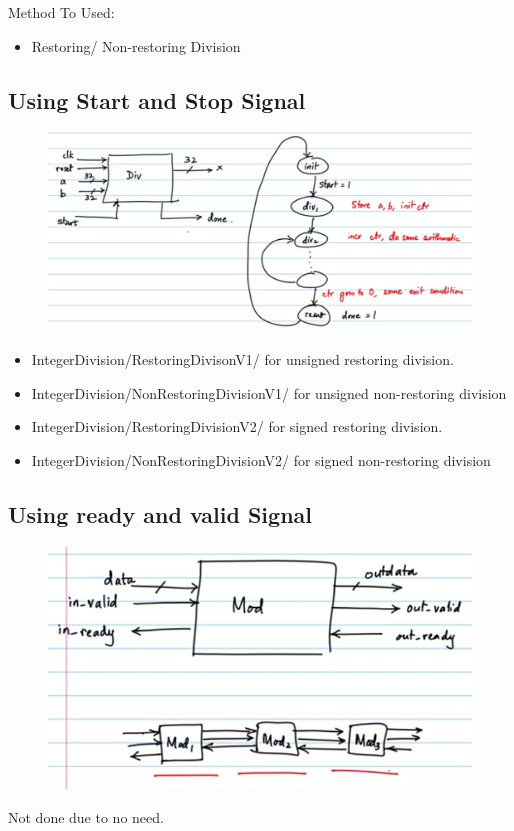 \documentclass{article}
\begin{document}
Method To Used:
\begin{itemize}
    \item Restoring/ Non-restoring Division
\end{itemize}


\subsection{Using Start and Stop Signal}
\begin{figure}[H]
    \centering
    \includegraphics[scale=0.3]{Resources/Images/Assignment2_IM1.png}
\end{figure}

\begin{itemize}
    \item IntegerDivision/RestoringDivisonV1/ for unsigned restoring division.
    \item IntegerDivision/NonRestoringDivisionV1/ for unsigned non-restoring division
    \item IntegerDivision/RestoringDivisionV2/ for signed restoring division.
    \item IntegerDivision/NonRestoringDivisionV2/ for signed non-restoring division
\end{itemize}

\subsection{Using ready and valid Signal}
\begin{figure}[H]
    \centering
    \includegraphics[scale=0.3]{Resources/Images/Assignment2_IM2.png}
\end{figure}
Not done due to no need.
\end{document}
